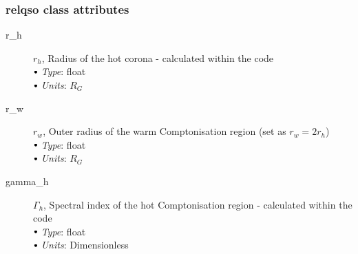 \documentclass[a4paper, 11pt, times, onecolumn]{article}
\newcommand{\sbt}{\,\begin{picture}(-1,1)(-1,-3)\circle*{3}\end{picture}\ }
\begin{document}
\subsubsection{{\sc relqso} class attributes}

\begin{description}

	\item[r\_h] $r_{h}$, Radius of the hot corona - calculated within the code \\
		$\sbt$ {\it Type}: float \\
		$\sbt$ {\it Units}: $R_{G}$
	
	\item[r\_w] $r_{w}$, Outer radius of the warm Comptonisation region (set as $r_{w} = 2r_{h}$) \\
		$\sbt$ {\it Type}: float \\
		$\sbt$ {\it Units}: $R_{G}$ 
	
	\item[gamma\_h] $\Gamma_{h}$, Spectral index of the hot Comptonisation region - calculated within the code \\
		$\sbt$ {\it Type}: float \\
		$\sbt$ {\it Units}: Dimensionless
	
\end{description}
\end{document}
